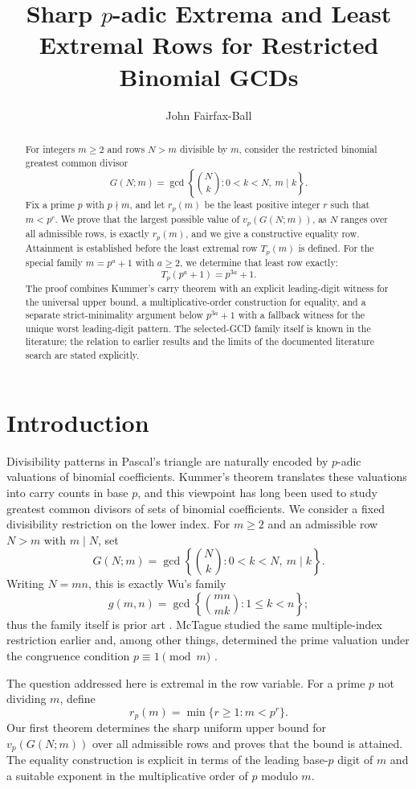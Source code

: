 \documentclass[11pt]{article}
\title{Sharp $p$-adic Extrema and Least Extremal Rows for Restricted Binomial GCDs}
\author{John Fairfax-Ball}
\date{}
\theoremstyle{definition}
\theoremstyle{remark}
\begin{document}
\maketitle

\begin{abstract}
For integers $m\ge 2$ and rows $N>m$ divisible by $m$, consider the restricted binomial greatest common divisor
\[
  G(N;m)=\gcd\left\{\binom Nk:0<k<N,\ m\mid k\right\}.
\]
Fix a prime $p$ with $p\nmid m$, and let $r_p(m)$ be the least positive integer $r$ such that $m<p^r$. We prove that the largest possible value of $v_p(G(N;m))$, as $N$ ranges over all admissible rows, is exactly $r_p(m)$, and we give a constructive equality row. Attainment is established before the least extremal row $T_p(m)$ is defined. For the special family $m=p^a+1$ with $a\ge2$, we determine that least row exactly:
\[
  T_p(p^a+1)=p^{3a}+1.
\]
The proof combines Kummer's carry theorem with an explicit leading-digit witness for the universal upper bound, a multiplicative-order construction for equality, and a separate strict-minimality argument below $p^{3a}+1$ with a fallback witness for the unique worst leading-digit pattern. The selected-GCD family itself is known in the literature; the relation to earlier results and the limits of the documented literature search are stated explicitly.
\end{abstract}

\section{Introduction}

Divisibility patterns in Pascal's triangle are naturally encoded by $p$-adic valuations of binomial coefficients. Kummer's theorem translates these valuations into carry counts in base $p$, and this viewpoint has long been used to study greatest common divisors of sets of binomial coefficients. We consider a fixed divisibility restriction on the lower index. For $m\ge2$ and an admissible row $N>m$ with $m\mid N$, set
\[
  G(N;m)=\gcd\left\{\binom Nk:0<k<N,\ m\mid k\right\}.
\]
Writing $N=mn$, this is exactly Wu's family
\[
  g(m,n)=\gcd\left\{\binom{mn}{mk}:1\le k<n\right\};
\]
thus the family itself is prior art \cite{Wu2026}. McTague studied the same multiple-index restriction earlier and, among other things, determined the prime valuation under the congruence condition $p\equiv1\pmod m$ \cite{McTague2017}.

The question addressed here is extremal in the row variable. For a prime $p$ not dividing $m$, define
\[
  r_p(m)=\min\{r\ge1:m<p^r\}.
\]
Our first theorem determines the sharp uniform upper bound for $v_p(G(N;m))$ over all admissible rows and proves that the bound is attained. The equality construction is explicit in terms of the leading base-$p$ digit of $m$ and a suitable exponent in the multiplicative order of $p$ modulo $m$.
\end{document}
